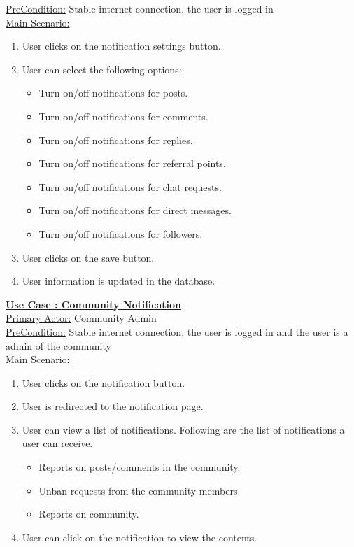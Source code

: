 \documentclass[conference,compsoc]{IEEEtran}
\newcounter{UC}
\newcommand{\nextU}{\stepcounter{UC}\theUC}
\begin{document}
\underline{PreCondition:} Stable internet connection, the user is logged in\\

\underline{Main Scenario:}\\
\begin{enumerate}
    \item User clicks on the notification settings button.
    \item User can select the following options:
          \begin{itemize}
              \item Turn on/off notifications for posts.
              \item Turn on/off notifications for comments.
              \item Turn on/off notifications for replies.
              \item Turn on/off notifications for referral points.
              \item Turn on/off notifications for chat requests.
              \item Turn on/off notifications for direct messages.
              \item Turn on/off notifications for followers.
          \end{itemize}
    \item User clicks on the save button.
    \item User information is updated in the database.
\end{enumerate}

\underline{\textbf{Use Case \nextU: Community Notification}}\\

\underline{Primary Actor:} Community Admin\\

\underline{PreCondition:} Stable internet connection, the user is logged in and the user is a admin of the community\\

\underline{Main Scenario:}\\
\begin{enumerate}
    \item User clicks on the notification button.
    \item User is redirected to the notification page.
    \item User can view a list of notifications. Following are the list of notifications a user can receive.
          \begin{itemize}
              \item Reports on posts/comments in the community.
              \item Unban requests from the community members.
              \item Reports on community.
          \end{itemize}
    \item User can click on the notification to view the contents.
\end{enumerate}
\end{document}
